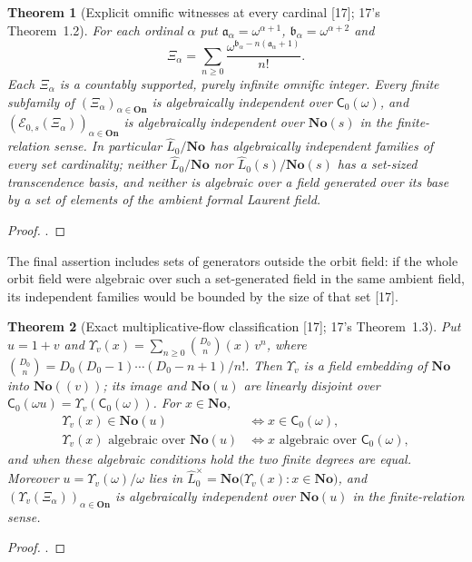 \documentclass[11pt,oneside]{article}
\numberwithin{equation}{section}
\newtheorem{theorem}{Theorem}[section]
\theoremstyle{definition}
\theoremstyle{remark}
\newcommand{\No}{\mathbf{No}}
\newcommand{\EE}{\mathcal E}
\newcommand{\src}[1]{\textup{\textsf{\small[#1]}}}
\newcommand{\On}{\mathbf{On}}
\begin{document}
\begin{theorem}[Explicit omnific witnesses at every cardinal \src{17}; 17's Theorem~1.2]\label{opa:of:thm:mainlarge}
For each ordinal $\alpha$ put $\mathfrak a_\alpha=\omega^{\alpha+1}$, $\mathfrak b_\alpha=\omega^{\alpha+2}$ and
\begin{equation}\label{opa:of:eq:Xi}
 \Xi_\alpha=\sum_{n\ge0}\frac{\omega^{\mathfrak b_\alpha-n(\mathfrak a_\alpha+1)}}{n!}.
\end{equation}
Each $\Xi_\alpha$ is a countably supported, purely infinite omnific integer. Every finite subfamily of
$(\Xi_\alpha)_{\alpha\in\On}$ is algebraically independent over $\mathsf C_0(\omega)$, and $(\EE_{0,s}(\Xi_\alpha))_{\alpha\in\On}$
is algebraically independent over $\No(s)$ in the finite-relation sense. In particular $\widehat L_0/\No$ has
algebraically independent families of every set cardinality; neither $\widehat L_0/\No$ nor $\widehat L_0(s)/\No(s)$ has a
set-sized transcendence basis, and neither is algebraic over a field generated over its base by a set of elements of the
ambient formal Laurent field.
\end{theorem}
\begin{proof}
.
\end{proof}

The final assertion includes sets of generators outside the orbit field: if the whole orbit field were algebraic over
such a set-generated field in the same ambient field, its independent families would be bounded by the size of that set
\src{17}.

\begin{theorem}[Exact multiplicative-flow classification \src{17}; 17's Theorem~1.3]\label{opa:of:thm:mainmult}
Put $u=1+v$ and $\Upsilon_v(x)=\sum_{n\ge0}\binom{D_0}n(x)\,v^n$, where
$\binom{D_0}n=D_0(D_0-1)\cdots(D_0-n+1)/n!$. Then $\Upsilon_v$ is a field embedding of $\No$ into $\No((v))$; its image and
$\No(u)$ are linearly disjoint over $\mathsf C_0(\omega u)=\Upsilon_v(\mathsf C_0(\omega))$. For $x\in\No$,
\begin{align*}
 \Upsilon_v(x)\in\No(u)&\iff x\in\mathsf C_0(\omega),\\
 \Upsilon_v(x)\text{ algebraic over }\No(u)&\iff x\text{ algebraic over }\mathsf C_0(\omega),
\end{align*}
and when these algebraic conditions hold the two finite degrees are equal. Moreover
$u=\Upsilon_v(\omega)/\omega$ lies in $\widehat L^\times_0=\No\bigl(\Upsilon_v(x):x\in\No\bigr)$, and $(\Upsilon_v(\Xi_\alpha))_{\alpha\in\On}$ is
algebraically independent over $\No(u)$ in the finite-relation sense.
\end{theorem}
\begin{proof}
.
\end{proof}
\end{document}

